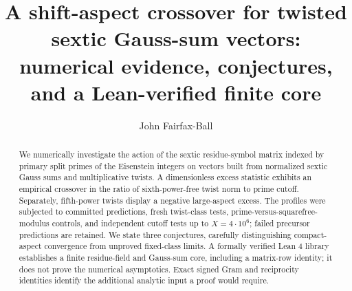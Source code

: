 \documentclass[11pt]{amsart}
\title[A shift-aspect crossover for sextic vectors]{A shift-aspect crossover for twisted sextic Gauss-sum vectors:\\
numerical evidence, conjectures, and a Lean-verified finite core}
\author{John Fairfax-Ball}
\date{}
\begin{document}
\begin{abstract}
We numerically investigate the action of the sextic residue-symbol matrix indexed
by primary split primes of the Eisenstein integers on vectors built from normalized
sextic Gauss sums and multiplicative twists. A dimensionless excess statistic
exhibits an empirical crossover in the ratio of sixth-power-free twist norm to
prime cutoff. Separately, fifth-power twists display a negative large-aspect
excess. The profiles were subjected to committed predictions, fresh twist-class
tests, prime-versus-squarefree-modulus controls, and independent cutoff tests up
to \(X=4\cdot10^6\); failed precursor predictions are retained. We state three
conjectures, carefully distinguishing compact-aspect convergence from unproved
fixed-class limits. A formally verified Lean 4 library establishes a finite
residue-field and Gauss-sum core, including a matrix-row identity; it does not
prove the numerical asymptotics. Exact signed Gram and reciprocity identities
identify the additional analytic input a proof would require.
\end{abstract}
\maketitle









\end{document}
